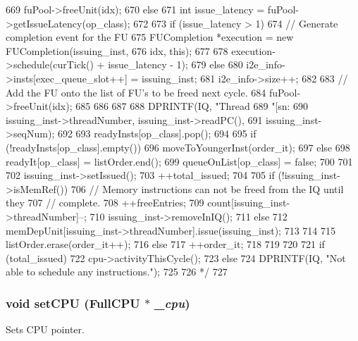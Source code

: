 \begin{DoxyCode}
{{{{669                 fuPool->freeUnit(idx);
670             } else {
671                 int issue_latency = fuPool->getIssueLatency(op_class);
672 
673                 if (issue_latency > 1) {
674                     // Generate completion event for the FU
675                     FUCompletion *execution = new FUCompletion(issuing_inst,
676                                                                idx, this);
677 
678                     execution->schedule(curTick() + issue_latency - 1);
679                 } else {
680                     i2e_info->insts[exec_queue_slot++] = issuing_inst;
681                     i2e_info->size++;
682 
683                     // Add the FU onto the list of FU's to be freed next cycle.
684                     fuPool->freeUnit(idx);
685                 }
686             }
687 
688             DPRINTF(IQ, "Thread %
689                     "[sn:%
690                     issuing_inst->threadNumber, issuing_inst->readPC(),
691                     issuing_inst->seqNum);
692 
693             readyInsts[op_class].pop();
694 
695             if (!readyInsts[op_class].empty()) {
696                 moveToYoungerInst(order_it);
697             } else {
698                 readyIt[op_class] = listOrder.end();
699                 queueOnList[op_class] = false;
700             }
701 
702             issuing_inst->setIssued();
703             ++total_issued;
704 
705             if (!issuing_inst->isMemRef()) {
706                 // Memory instructions can not be freed from the IQ until they
707                 // complete.
708                 ++freeEntries;
709                 count[issuing_inst->threadNumber]--;
710                 issuing_inst->removeInIQ();
711             } else {
712                 memDepUnit[issuing_inst->threadNumber].issue(issuing_inst);
713             }
714 
715             listOrder.erase(order_it++);
716         } else {
717             ++order_it;
718         }
719     }
720 
721     if (total_issued) {
722         cpu->activityThisCycle();
723     } else {
724         DPRINTF(IQ, "Not able to schedule any instructions.\n");
725     }
726 */
727 }
\end{DoxyCode}
\hypertarget{classInstQueue_aa783e99c55fd8695cb33c087d14bece0}{
\subsubsection[{setCPU}]{\setlength{\rightskip}{0pt plus 5cm}void setCPU ({\bf FullCPU} $\ast$ {\em \_\-cpu})}}
\label{classInstQueue_aa783e99c55fd8695cb33c087d14bece0}
Sets CPU pointer. 



